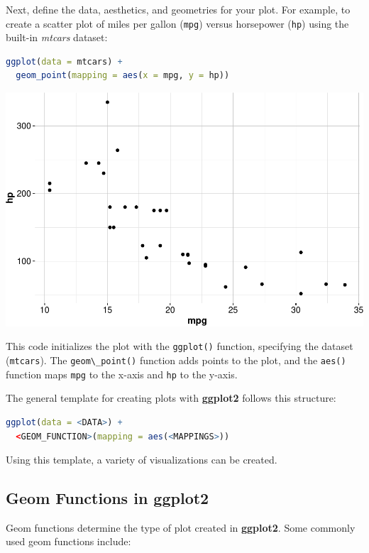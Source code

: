 \documentclass[
]{book}
\newcommand{\passthrough}[1]{#1}
\theoremstyle{definition}
\theoremstyle{definition}
\theoremstyle{definition}
\theoremstyle{definition}
\theoremstyle{remark}
\begin{document}
Next, define the data, aesthetics, and geometries for your plot. For example, to create a scatter plot of miles per gallon (\passthrough{\lstinline!mpg!}) versus horsepower (\passthrough{\lstinline!hp!}) using the built-in \emph{mtcars} dataset:

\begin{lstlisting}[language=R]
ggplot(data = mtcars) +
  geom_point(mapping = aes(x = mpg, y = hp))
\end{lstlisting}

\begin{center}\includegraphics[width=0.7\linewidth]{Intro-R_files/figure-latex/unnamed-chunk-32-1} \end{center}

This code initializes the plot with the \passthrough{\lstinline!ggplot()!} function, specifying the dataset (\passthrough{\lstinline!mtcars!}). The \passthrough{\lstinline!geom\_point()!} function adds points to the plot, and the \passthrough{\lstinline!aes()!} function maps \passthrough{\lstinline!mpg!} to the x-axis and \passthrough{\lstinline!hp!} to the y-axis.

The general template for creating plots with \textbf{ggplot2} follows this structure:

\begin{lstlisting}[language=R]
ggplot(data = <DATA>) +
  <GEOM_FUNCTION>(mapping = aes(<MAPPINGS>))
\end{lstlisting}

Using this template, a variety of visualizations can be created.

\subsection*{Geom Functions in ggplot2}\label{geom-functions-in-ggplot2}

Geom functions determine the type of plot created in \textbf{ggplot2}. Some commonly used geom functions include:
\end{document}
